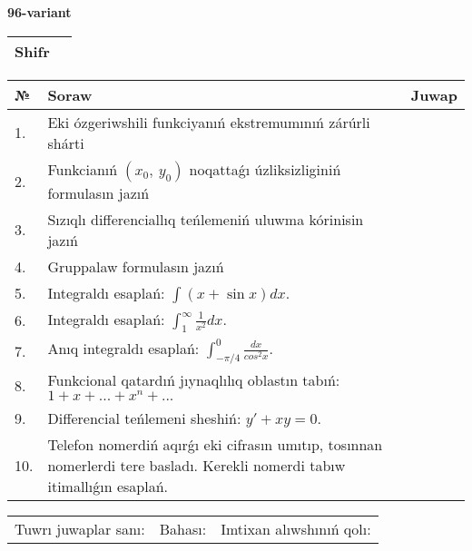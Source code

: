 \documentclass{article}
\begin{document}
  \egroup
  
  \newpage
  
  
  \textbf{96-variant}\\
  
  \bgroup
  \def\arraystretch{1.6} %
  
  \begin{tabular}{|m{5.7cm}|m{9.5cm}|}
  \hline
  Shifr & \\
  \hline
  \end{tabular}
  
  \vspace{1cm}
  
  \begin{tabular}{|m{0.7cm}|m{10cm}|m{4cm}|}
  \hline
  № & Soraw & Juwap \\
  \hline
  1. & Eki ózgeriwshili funkciyanıń ekstremumınıń zárúrli shárti &  \\
  \hline
  2. & Funkcianıń \((x_{0},\ y_{0})\) noqattaǵı úzliksizliginiń formulasın jazıń &  \\
  \hline
  3. & Sızıqlı differenciallıq teńlemeniń uluwma kórinisin jazıń &  \\
  \hline
  4. & Gruppalaw formulasın jazıń &  \\
  \hline
  5. & Integraldı esaplań: \(\int{(x + \sin x)dx}\). &  \\
  \hline
  6. & Integraldı esaplań: \(\int_{1}^{\infty}{\frac{1}{x^2 }dx}\). &  \\
  \hline
  7. & Anıq integraldı esaplań: \(\int_{- \pi/4}^{0}\frac{dx}{cos^2 x}\). &  \\
  \hline
  8. & Funkcional qatardıń jıynaqlılıq oblastın tabıń:\(1 + x + ... + x^{n} + ...\) &  \\
  \hline
  9. & Differencial teńlemeni sheshiń: \(y' + xy = 0\). &  \\
  \hline
  10. & Telefon nomerdiń aqırǵı eki cifrasın umıtıp, tosınnan nomerlerdi tere basladı. Kerekli nomerdi tabıw itimallıǵın esaplań. &  \\
  \hline
  \end{tabular}
  
  \vspace{1cm}
  
  \begin{tabular}{lll}
  Tuwrı juwaplar sanı: \underline{\hspace{1.5cm}} & 
  Bahası: \underline{\hspace{1.5cm}} & 
  Imtixan alıwshınıń qolı: \underline{\hspace{2cm}} \\
  \end{tabular}
  
\end{document}
